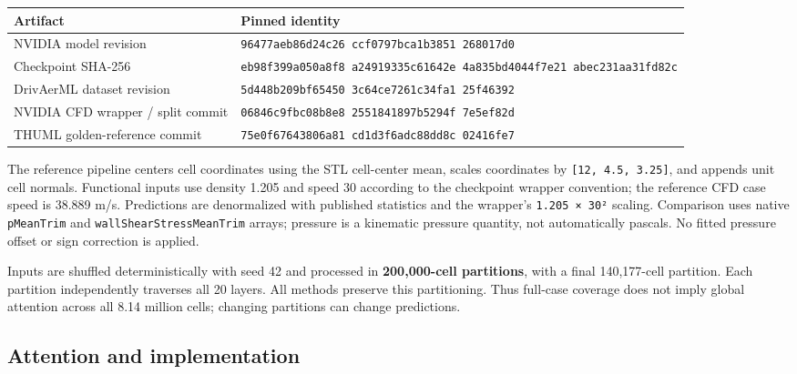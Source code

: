 \documentclass[
  10pt,
]{article}
\newcounter{none} %
\begin{document}
{\def\LTcaptype{none} %
\begin{longtable}[]{@{}
  >{\raggedright\arraybackslash}p{}
  >{\raggedright\arraybackslash}p{}@{}}
\toprule\noalign{}
\begin{minipage}[b]{\linewidth}\raggedright
Artifact
\end{minipage} & \begin{minipage}[b]{\linewidth}\raggedright
Pinned identity
\end{minipage} \\
\midrule\noalign{}
\endhead
\bottomrule\noalign{}
\endlastfoot
NVIDIA model revision &
\texttt{96477aeb86d24c26\ ccf0797bca1b3851\ 268017d0} \\
Checkpoint SHA-256 &
\texttt{eb98f399a050a8f8\ a24919335c61642e\ 4a835bd4044f7e21\ abec231aa31fd82c} \\
DrivAerML dataset revision &
\texttt{5d448b209bf65450\ 3c64ce7261c34fa1\ 25f46392} \\
NVIDIA CFD wrapper / split commit &
\texttt{06846c9fbc08b8e8\ 2551841897b5294f\ 7e5ef82d} \\
THUML golden-reference commit &
\texttt{75e0f67643806a81\ cd1d3f6adc88dd8c\ 02416fe7} \\
\end{longtable}
}

The reference pipeline centers cell coordinates using the STL
cell-center mean, scales coordinates by \texttt{{[}12,\ 4.5,\ 3.25{]}},
and appends unit cell normals. Functional inputs use density 1.205 and
speed 30 according to the checkpoint wrapper convention; the reference
CFD case speed is 38.889 m/s. Predictions are denormalized with
published statistics and the wrapper's \texttt{1.205\ ×\ 30²} scaling.
Comparison uses native \texttt{pMeanTrim} and
\texttt{wallShearStressMeanTrim} arrays; pressure is a kinematic
pressure quantity, not automatically pascals. No fitted pressure offset
or sign correction is applied.

Inputs are shuffled deterministically with seed 42 and processed in
\textbf{200,000-cell partitions}, with a final 140,177-cell partition.
Each partition independently traverses all 20 layers. All methods
preserve this partitioning. Thus full-case coverage does not imply
global attention across all 8.14 million cells; changing partitions can
change predictions.

\subsection{Attention and
implementation}\label{attention-and-implementation}
\end{document}
